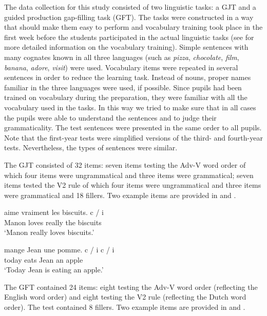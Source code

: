 \documentclass[output=paper,modfonts,nonflat, newtxmath]{langsci/langscibook}
\begin{document}
The data collection for this study consisted of two linguistic tasks: a GJT and a guided production gap-filling task (GFT). The tasks were constructed in a way that should make them easy to perform and vocabulary training took place in the first week before the students participated in the actual linguistic tasks (see  for more detailed information on the vocabulary training). Simple sentences with many cognates known in all three languages (such as \textit{pizza}, \textit{chocolate}, \textit{film}, \textit{banana}, \textit{adore}, \textit{visit}) were used. Vocabulary items were repeated in several sentences in order to reduce the learning task. Instead of nouns, proper names familiar in the three languages were used, if possible. Since pupils had been trained on vocabulary during the preparation, they were familiar with all the vocabulary used in the tasks. In this way we tried to make sure that in all cases the pupils were able to understand the sentences and to judge their grammaticality. The test sentences were presented in the same order to all pupils. Note that the first-year tests were simplified versions of the third- and fourth-year tests. Nevertheless, the types of sentences were similar.

The GJT consisted of 32 items: seven items testing the Adv-V word order of which four items were ungrammatical and three items were grammatical; seven items tested the V2 rule of which four items were ungrammatical and three items were grammatical and 18 fillers. Two example items are provided in  and .

  \ea%
  \label{ex:stadt:2}
   {aime} {vraiment} {les} {biscuits.}    c / i\\
  		Manon loves really     the biscuits\\
  \glt ‘Manon really loves biscuits.’
  \z

  \ea%
  \label{ex:stadt:3}
   {mange} {Jean} {une} {pomme.}  c / i   c / i\\
		  today eats Jean an apple\\
  \glt ‘Today Jean is eating an apple.’
  \z



The GFT contained 24 items: eight testing the Adv-V word order (reflecting the English word order) and eight testing the V2 rule (reflecting the Dutch word order). The test contained 8 fillers. Two example items are provided in  and .
\end{document}

